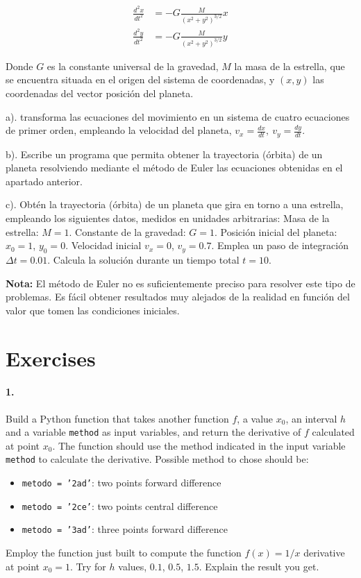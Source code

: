 \begin{align*}
\frac{d^2x}{dt^2} &= -G\frac{M}{(x^2+y^2)^{3/2}}x\\
\frac{d^2y}{dt^2} &= -G\frac{M}{(x^2+y^2)^{3/2}}y
\end{align*}

Donde $G$ es la constante universal de la gravedad, $M$ la masa de la estrella, que se encuentra situada en el origen del sistema de coordenadas, y $(x,y)$ las coordenadas del vector posición del planeta.

a). transforma las ecuaciones del movimiento en un sistema de cuatro ecuaciones de primer orden, empleando la velocidad del planeta, $v_x = \frac{dx}{dt},\ v_y = \frac{dy}{dt} $. 

b). Escribe un programa que permita obtener la trayectoria (órbita) de un planeta resolviendo mediante el método de Euler las ecuaciones obtenidas en el apartado anterior.

c). Obtén la trayectoria (órbita) de un planeta que gira en torno a una estrella, empleando los siguientes datos, medidos en unidades arbitrarias: Masa de la estrella: $M=1$. Constante de la gravedad: $G=1$. Posición inicial del planeta: $x_0 = 1$, $y_0=0$. Velocidad inicial $v_x = 0$, $v_y = 0.7$. Emplea un paso de integración $\Delta t =0.01$. Calcula la solución durante un tiempo total $t = 10$.


\textbf{Nota:} El método de Euler no es suficientemente preciso para resolver este tipo de problemas. Es fácil obtener resultados muy alejados de la realidad en función del valor que tomen las condiciones iniciales. 


\section{Exercises}
\paragraph{1.} Build a Python function that takes another function $f$, a value $x_0$, an interval $h$ and a variable \texttt{method} as input variables, and return the derivative of $f$ calculated at point $x_0$. The function should use the method indicated in the input variable \texttt{method} to calculate the derivative. Possible method to chose should be:
\begin{itemize}
	\item \texttt{metodo = '2ad'}: two points forward difference
	\item \texttt{metodo = '2ce'}: two points central difference
	\item \texttt{metodo = '3ad'}: three points forward difference
\end{itemize}
Employ the function just built to compute the function $f(x) = 1/x$ derivative at point $x_0 = 1$. Try for $h$ values,  $0.1$, $0.5$, $1.5$. Explain the result you get.

